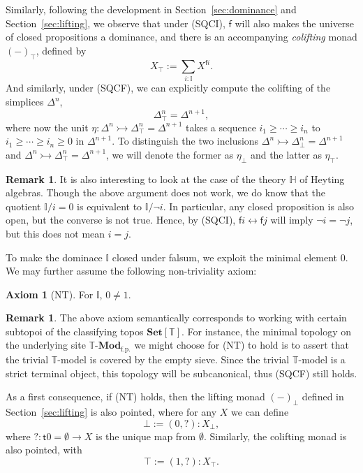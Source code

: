 \documentclass[12pt]{amsart}
\theoremstyle{definition}
\newtheorem{remark}[theorem]{Remark}
\newtheorem{axiom}{Axiom}
\newcommand{\mb}[1]{\mathbf{#1}}
\newcommand{\mbb}[1]{\mathbb{#1}}
\newcommand{\T}{\mbb T}
\newcommand{\I}{\mbb I}
\newcommand{\mr}[1]{\mathrm{#1}}
\newcommand{\ms}[1]{\mathsf{#1}}
\newcommand{\Set}{\mb{Set}}
\newcommand{\inj}{\rightarrowtail}
\newcommand{\fp}{_{\mr{f.p.}}}
\newcommand{\prt}{_{\bot}}
\newcommand{\cprt}{_{\top}}
\newcommand{\emp}{\emptyset}
\newcommand{\eq}{\leftrightarrow}
\newcommand{\mmod}[1]{#1\text{-}\mathbf{Mod}}
\begin{document}
Similarly, following the development in Section~\ref{sec:dominance} and Section~\ref{sec:lifting}, we observe that under (SQCI), $\ms f$ will also makes the universe of closed propositions a dominance, and there is an accompanying \emph{colifting} monad $(-)\cprt$, defined by
\[ X\cprt := \sum_{i:\I} X^{\ms fi}. \]
And similarly, under (SQCF), we can explicitly compute the colifting of the simplices $\Delta^n$,
\[ \Delta^n\cprt = \Delta^{n+1}, \]
where now the unit $\eta : \Delta^n \inj \Delta^n\cprt = \Delta^{n+1}$ takes a sequence $i_1 \ge \cdots \ge i_n$ to $i_1 \ge \cdots \ge i_n \ge 0$ in $\Delta^{n+1}$. To distinguish the two inclusions $\Delta^n \inj \Delta^n\prt = \Delta^{n+1}$ and $\Delta^n \inj \Delta^{n}\cprt = \Delta^{n+1}$, we will denote the former as $\eta\prt$ and the latter as $\eta\cprt$.

\begin{remark}
  It is also interesting to look at the case of the theory $\mbb H$ of Heyting algebras. Though the above argument does not work, we do know that the quotient $\I/i=0$ is equivalent to $\I/\neg i$. In particular, any closed proposition is also open, but the converse is not true. Hence, by (SQCI), $\ms fi \eq \ms fj$ will imply $\neg i = \neg j$, but this does not mean $i = j$.
\end{remark}

To make the dominace $\I$ closed under falsum, we exploit the minimal element $0$. We may further assume the following non-triviality axiom:

\begin{axiom}[NT]\label{ax:nt}
  For $\I$, $0 \neq 1$.
\end{axiom}

\begin{remark}
  The above axiom semantically corresponds to working with certain subtopoi of the classifying topos $\Set[\T]$. For instance, the minimal topology on the underlying site $\mmod\T\fp$ we might choose for (NT) to hold is to assert that the trivial $\T$-model is covered by the empty sieve. Since the trivial $\T$-model is a strict terminal object, this topology will be subcanonical, thus (SQCF) still holds.
\end{remark}

As a first consequence, if (NT) holds, then the lifting monad $(-)\prt$ defined in Section~\ref{sec:lifting} is also pointed, where for any $X$ we can define
\[ \bot := (0,?) : X\prt, \]
where $? : \ms t0 = \emp \to X$ is the unique map from $\emp$. Similarly, the colifting monad is also pointed, with
\[ \top := (1,?) : X\cprt. \]
\end{document}
